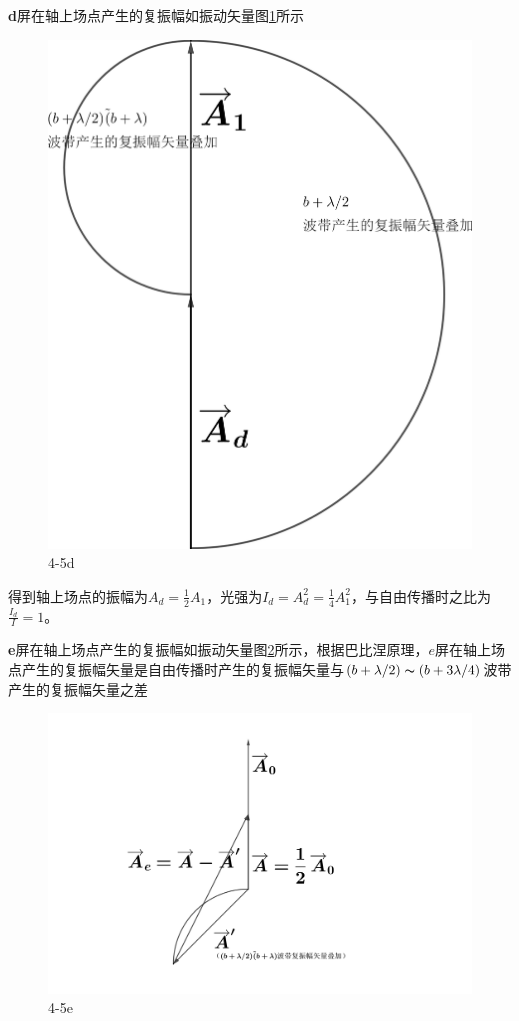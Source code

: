 \documentclass[10pt,a4paper]{article}
\begin{document}
\textbf{d}屏在轴上场点产生的复振幅如振动矢量图\ref{OpticsHomework_6_4-5d}所示
\begin{figure}[h]
\centering
\includegraphics[scale=.12]{OpticsHomework_6_4-5d(tailored).png}
\caption{4-5d}\label{OpticsHomework_6_4-5d}
\end{figure}

\noindent 得到轴上场点的振幅为$A_d=\frac{1}{2}A_1$，光强为$I_d=A_d^2=\frac{1}{4}A_1^2$，与自由传播时之比为$\frac{I_d}{I}=1$。

\textbf{e}屏在轴上场点产生的复振幅如振动矢量图\ref{OpticsHomework_6_4-5e}所示，根据巴比涅原理，$e$屏在轴上场点产生的复振幅矢量是自由传播时产生的复振幅矢量与$(b+\lambda/2)\thicksim(b+3\lambda/4)$波带产生的复振幅矢量之差
\begin{figure}[h]
\centering
\includegraphics[scale=.15]{OpticsHomework_6_4-5e(tailored).png}
\caption{4-5e}\label{OpticsHomework_6_4-5e}
\end{figure}
\end{document}
